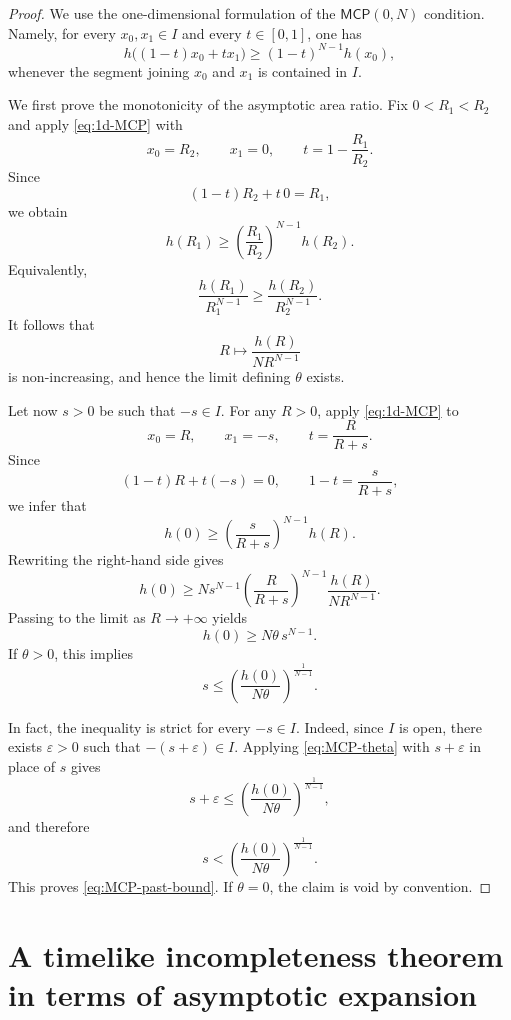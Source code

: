 \documentclass[a4paper,10pt]{article}
\newcommand{\MCP}{\mathsf{MCP}}
\theoremstyle{plain}
\theoremstyle{definition}
\numberwithin{equation}{section}
\begin{document}
\begin{proof}
We use the one-dimensional formulation of the $\MCP(0,N)$ condition.
Namely, for every $x_0,x_1\in I$ and every $t\in[0,1]$, one has
\begin{equation}\label{eq:1d-MCP}
h\bigl((1-t)x_0+t x_1\bigr)
\geq
(1-t)^{N-1}h(x_0),
\end{equation}
whenever the segment joining $x_0$ and $x_1$ is contained in $I$.

We first prove the monotonicity of the asymptotic area ratio. Fix
$0<R_1<R_2$ and apply \eqref{eq:1d-MCP} with
\[
x_0=R_2,\qquad x_1=0,
\qquad
t=1-\frac{R_1}{R_2}.
\]
Since
\[
(1-t)R_2+t\,0=R_1,
\]
we obtain
\[
h(R_1)
\geq
\left(\frac{R_1}{R_2}\right)^{N-1}h(R_2).
\]
Equivalently,
\[
\frac{h(R_1)}{R_1^{N-1}}
\geq
\frac{h(R_2)}{R_2^{N-1}}.
\]
It follows that
\[
R\longmapsto\frac{h(R)}{N R^{N-1}}
\]
is non-increasing, and hence the limit defining $\theta$ exists.

Let now $s>0$ be such that $-s\in I$. For any $R>0$, apply
\eqref{eq:1d-MCP} to
\[
x_0=R,\qquad x_1=-s,
\qquad
t=\frac{R}{R+s}.
\]
Since
\[
(1-t)R+t(-s)=0,
\qquad
1-t=\frac{s}{R+s},
\]
we infer that
\begin{equation}\label{eq:MCP-0-R}
h(0)
\geq
\left(\frac{s}{R+s}\right)^{N-1}h(R).
\end{equation}
Rewriting the right-hand side gives
\[
h(0)
\geq
N s^{N-1}
\left(\frac{R}{R+s}\right)^{N-1}
\frac{h(R)}{N R^{N-1}}.
\]
Passing to the limit as $R\to+\infty$ yields
\begin{equation}\label{eq:MCP-theta}
h(0)\geq N\theta\,s^{N-1}.
\end{equation}
If $\theta>0$, this implies
\[
s\leq
\left(\frac{h(0)}{N\theta}\right)^{\frac1{N-1}}.
\]

In fact, the inequality is strict for every $-s\in I$. Indeed, since
$I$ is open, there exists $\varepsilon>0$ such that
$-(s+\varepsilon)\in I$. Applying \eqref{eq:MCP-theta} with
$s+\varepsilon$ in place of $s$ gives
\[
s+\varepsilon
\leq
\left(\frac{h(0)}{N\theta}\right)^{\frac1{N-1}},
\]
and therefore
\[
s<
\left(\frac{h(0)}{N\theta}\right)^{\frac1{N-1}}.
\]
This proves \eqref{eq:MCP-past-bound}. If $\theta=0$, the claim is
void by convention.
\end{proof}










\section{A timelike incompleteness theorem in terms of asymptotic expansion}
\end{document}
